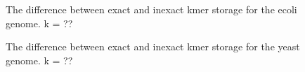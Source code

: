 \documentclass[12pt]{article} \usepackage{simplemargins}
\begin{document}
\begin{figure}
\caption{The difference between exact and inexact kmer storage for the
ecoli genome. k = ??}
\end{figure}

\begin{figure}
\caption{The difference between exact and inexact kmer storage for the
yeast genome. k = ??}
\end{figure}
\end{document}
